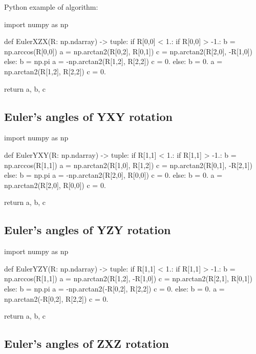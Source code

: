     Python example of algorithm:

\begin{python}
import numpy as np

def EulerXZX(R: np.ndarray) -> tuple:
    if R[0,0] < 1.:
        if R[0,0] > -1.:
            b = np.arccos(R[0,0])
            a = np.arctan2(R[0,2], R[0,1])
            c = np.arctan2(R[2,0], -R[1,0])
        else:
            b = np.pi
            a = -np.arctan2(R[1,2], R[2,2])
            c = 0.
    else:
        b = 0.
        a = np.arctan2(R[1,2], R[2,2])
        c = 0.

    return a, b, c
\end{python}

\subsection{Euler's angles of \textbf{YXY} rotation}

\begin{python}
import numpy as np

def EulerYXY(R: np.ndarray) -> tuple:
    if R[1,1] < 1.:
        if R[1,1] > -1.:
            b = np.arccos(R[1,1])
            a = np.arctan2(R[1,0], R[1,2])
            c = np.arctan2(R[0,1], -R[2,1])
        else:
            b = np.pi
            a = -np.arctan2(R[2,0], R[0,0])
            c = 0.
    else:
        b = 0.
        a = np.arctan2(R[2,0], R[0,0])
        c = 0.

    return a, b, c
\end{python}

\subsection{Euler's angles of \textbf{YZY} rotation}

\begin{python}
import numpy as np

def EulerYZY(R: np.ndarray) -> tuple:
    if R[1,1] < 1.:
        if R[1,1] > -1.:
            b = np.arccos(R[1,1])
            a = np.arctan2(R[1,2], -R[1,0])
            c = np.arctan2(R[2,1], R[0,1])
        else:
            b = np.pi
            a = -np.arctan2(-R[0,2], R[2,2])
            c = 0.
    else:
        b = 0.
        a = np.arctan2(-R[0,2], R[2,2])
        c = 0.

    return a, b, c
\end{python}

\subsection{Euler's angles of \textbf{ZXZ} rotation}

